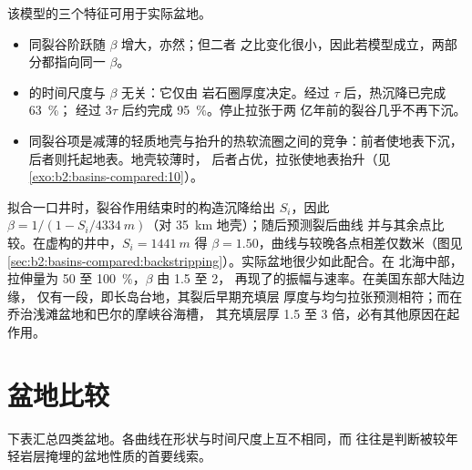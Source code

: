 该模型的三个特征可用于实际盆地。
\begin{itemize}
  \item 同裂谷阶跃随 $\beta$ 增大，亦然；但二者
        之比变化很小，因此若模型成立，两部分都指向同一 $\beta$。
  \item {}的时间尺度与 $\beta$ 无关：它仅由
        岩石圈厚度决定。经过 $\tau$ 后，热沉降已完成 \qty{63}{\percent}；
        经过 $3\tau$ 后约完成 \qty{95}{\percent}。停止拉张于两
        亿年前的裂谷几乎不再下沉。
  \item 同裂谷项是减薄的轻质地壳与抬升的热软流圈之间的竞争：前者使地表下沉，
        后者则托起地表。地壳较薄时，
        后者占优，拉张使地表抬升（见\cref{exo:b2:basins-compared:10}）。
\end{itemize}

拟合一口井时，裂谷作用结束时的构造沉降给出 $S_i$，因此
$\beta = 1/(1 - S_i/\qty{4334}{m})$（对 \qty{35}{km} 地壳）；随后预测裂后曲线
并与其余点比较。在虚构的井中，$S_i = \qty{1441}{m}$
得 $\beta = 1.50$，曲线与较晚各点相差仅数米（图见
\cref{sec:b2:basins-compared:backstripping}）。实际盆地很少如此配合。在
北海中部，拉伸量为 50 至 \qty{100}{\percent}，$\beta$ 由 1.5 至 2，
再现了的振幅与速率。在美国东部大陆边缘，
仅有一段，即长岛台地，其裂后早期充填层
厚度与均匀拉张预测相符；而在乔治浅滩盆地和巴尔的摩峡谷海槽，
其充填层厚 1.5 至 3 倍，必有其他原因在起作用。

\section{盆地比较}\label{sec:b2:basins-compared:compared}

下表汇总四类盆地。各曲线在形状与时间尺度上互不相同，而
往往是判断被较年轻岩层掩埋的盆地性质的首要线索。

